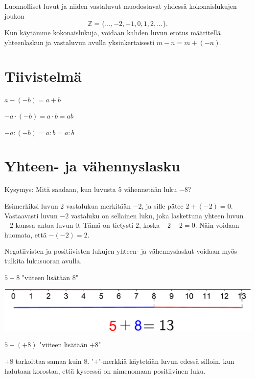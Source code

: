 Luonnolliset luvut ja niiden vastaluvut muodostavat yhdessä
kokonaislukujen joukon
\[\mathbb{Z} = \{\ldots, -2, -1, 0, 1, 2, \ldots\}.\]
Kun käytämme kokonaislukuja, voidaan kahden luvun erotus määritellä
yhteenlaskun ja vastaluvun avulla yksinkertaisesti $m-n = m+(-n)$.


\section{Tiivistelmä}

    $a-(-b)=a+b$
    
    $-a\cdot (-b)=a\cdot b=ab$
    
    $-a:(-b)=a: b=a:b$
    

\section{Yhteen- ja vähennyslasku}

    Kysymys: Mitä saadaan, kun luvusta $5$ vähennetään luku $-8$?
    
    
    Esimerkiksi luvun $2$ vastalukua merkitään $-2$, ja sille pätee $2+(-2)=0$. Vastaavasti luvun $-2$ vastaluku on sellainen luku, joka laskettuna yhteen luvun $-2$ kanssa antaa luvun $0$. Tämä on tietysti $2$, koska $-2+2=0$. Näin voidaan huomata, että $-(-2)=2$.
    
    Negatiivisten ja positiivisten lukujen yhteen- ja vähennyslaskut voidaan myös tulkita lukusuoran avulla.
    
    
    $5+8$ "viiteen lisätään $8$"
    \begin{center}
    \includegraphics[scale=0.5]{01-luvut/kuvia/5plus8on13-crop.pdf}
    \end{center}
    
    $5+(+8)$ "viiteen lisätään $+8$"
    
    $+8$ tarkoittaa samaa kuin $8$. '$+$'-merkkiä käytetään luvun edessä silloin, kun halutaan korostaa, että kyseessä on nimenomaan positiivinen luku.
    
